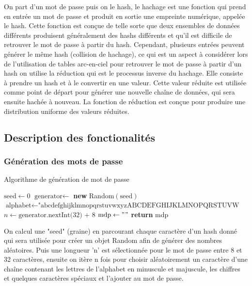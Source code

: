 \documentclass[a4paper,12pt]{article}
\begin{document}
On part d'un mot de passe puis on le hash, le hachage est une fonction qui prend en entrée un mot de passe et produit en sortie une empreinte numérique, appelée le hash. Cette fonction est conçue de telle sorte que deux ensembles de données différents produisent généralement des hashs différents et qu'il est difficile de retrouver le mot de passe à partir du hash. Cependant, plusieurs entrées peuvent générer le même hash (collision de hachage), ce qui est un aspect à considérer lors de l'utilisation de tables arc-en-ciel pour retrouver le mot de passe à partir d'un hash on utilise la réduction qui est le processus inverse du hachage. Elle consiste à prendre un hash et à le convertir en une valeur. Cette valeur réduite est utilisée comme point de départ pour générer une nouvelle chaîne de données, qui sera ensuite hachée à nouveau. La fonction de réduction est conçue pour produire une distribution uniforme des valeurs réduites.
\subsection{Description des fonctionalités}
\subsubsection{Génération des mots de passe}
    \begin{algorithm}[H]
        \caption{Algorithme de génération de mot de passe}
        $\text{seed} \gets 0$\;
        $\text{generator} \gets$ \textbf{new} Random$(\text{seed})$\;
        $\text{alphabet} \gets \text{"abcdefghijklmnopqrstuvwxyzABCDEFGHIJKLMNOPQRSTUVW}$ \;
        $n \gets \text{generator.nextInt(32) + 8}$\;
        $\text{mdp} \gets ""$\;
        \textbf{return} mdp\;
    \end{algorithm}

    On calcul une "seed" (graine) en parcourant chaque caractère d'un hash donné qui sera utilisée pour créer un objet Random afin de générer des nombres aléatoires. Puis une longueur 'n' est sélectionnée pour le mot de passe entre 8 et 32 caractères, ensuite on itère n fois pour choisir aléatoirement un caractère d'une chaîne contenant les lettres de l'alphabet en minuscule et majuscule, les chiffres et quelques caractères spéciaux et l'ajouter au mot de passe.
    
\end{document}
